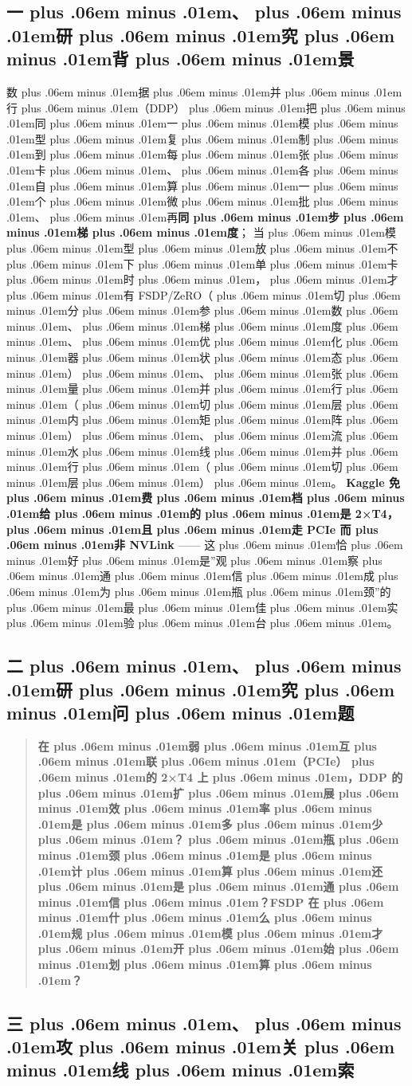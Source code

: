 \documentclass[
]{article}
\def\zh#1{{\zhfont #1}}
\def\sym#1{{\symfont #1}}
\def\zhglue{\hskip0pt plus .06em minus .01em}
\begin{document}
\subsection{\zh{一\zhglue 、\zhglue 研\zhglue 究\zhglue 背\zhglue 景}}\label{ux4e00ux7814ux7a76ux80ccux666f-4}

\zh{数\zhglue 据\zhglue 并\zhglue 行\zhglue （}DDP\zh{）\zhglue 把\zhglue 同\zhglue 一\zhglue 模\zhglue 型\zhglue 复\zhglue 制\zhglue 到\zhglue 每\zhglue 张\zhglue 卡\zhglue 、\zhglue 各\zhglue 自\zhglue 算\zhglue 一\zhglue 个\zhglue 微\zhglue 批\zhglue 、\zhglue 再}\textbf{\zh{同\zhglue 步\zhglue 梯\zhglue 度}}\zh{；} \zh{当\zhglue 模\zhglue 型\zhglue 放\zhglue 不\zhglue 下\zhglue 单\zhglue 卡\zhglue 时\zhglue ，\zhglue 才\zhglue 有} FSDP/ZeRO\zh{（\zhglue 切\zhglue 分\zhglue 参\zhglue 数\zhglue 、\zhglue 梯\zhglue 度\zhglue 、\zhglue 优\zhglue 化\zhglue 器\zhglue 状\zhglue 态\zhglue ）\zhglue 、\zhglue 张\zhglue 量\zhglue 并\zhglue 行\zhglue （\zhglue 切\zhglue 层\zhglue 内\zhglue 矩\zhglue 阵\zhglue ）\zhglue 、\zhglue 流\zhglue 水\zhglue 线\zhglue 并\zhglue 行\zhglue （\zhglue 切\zhglue 层\zhglue ）\zhglue 。} \textbf{Kaggle \zh{免\zhglue 费\zhglue 档\zhglue 给\zhglue 的\zhglue 是} 2\sym{×}T4\zh{，\zhglue 且\zhglue 走} PCIe \zh{而\zhglue 非} NVLink} ------ \zh{这\zhglue 恰\zhglue 好\zhglue 是}''\zh{观\zhglue 察\zhglue 通\zhglue 信\zhglue 成\zhglue 为\zhglue 瓶\zhglue 颈}''\zh{的\zhglue 最\zhglue 佳\zhglue 实\zhglue 验\zhglue 台\zhglue 。}

\subsection{\zh{二\zhglue 、\zhglue 研\zhglue 究\zhglue 问\zhglue 题}}\label{ux4e8cux7814ux7a76ux95eeux9898}

\begin{quote}
\textbf{\zh{在\zhglue 弱\zhglue 互\zhglue 联\zhglue （}PCIe\zh{）\zhglue 的} 2\sym{×}T4 \zh{上\zhglue ，}DDP \zh{的\zhglue 扩\zhglue 展\zhglue 效\zhglue 率\zhglue 是\zhglue 多\zhglue 少\zhglue ？\zhglue 瓶\zhglue 颈\zhglue 是\zhglue 计\zhglue 算\zhglue 还\zhglue 是\zhglue 通\zhglue 信\zhglue ？}FSDP \zh{在\zhglue 什\zhglue 么\zhglue 规\zhglue 模\zhglue 才\zhglue 开\zhglue 始\zhglue 划\zhglue 算\zhglue ？}}
\end{quote}

\subsection{\zh{三\zhglue 、\zhglue 攻\zhglue 关\zhglue 线\zhglue 索}}\label{ux4e09ux653bux5173ux7ebfux7d22-4}
\end{document}
